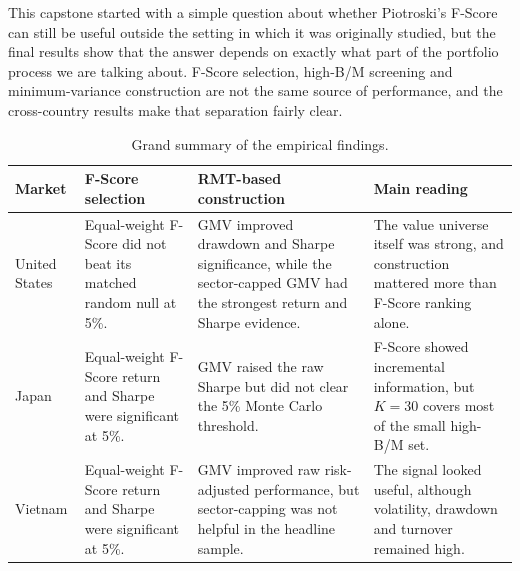 \documentclass[11pt,a4paper]{report}
\numberwithin{figure}{chapter}
\numberwithin{table}{chapter}
\numberwithin{equation}{chapter}
\begin{document}
This capstone started with a simple question about whether Piotroski's F-Score can still be useful outside the setting in which it was originally studied, but the final results show that the answer depends on exactly what part of the portfolio process we are talking about. F-Score selection, high-B/M screening and minimum-variance construction are not the same source of performance, and the cross-country results make that separation fairly clear.

\begin{table}[H]
\centering
\scriptsize
\caption{Grand summary of the empirical findings.}
\label{tab:grand_summary}

\setlength{\tabcolsep}{2.5pt}

\begin{tabular}{
@{}
>{\raggedright\arraybackslash}m{}
>{\raggedright\arraybackslash}m{}
>{\raggedright\arraybackslash}m{}
>{\raggedright\arraybackslash}m{}
@{}
}
\hline

\textbf{Market} &
\textbf{F-Score selection} &
\textbf{RMT-based construction} &
\textbf{Main reading} \\
\hline

United States &
Equal-weight F-Score did not beat its matched random null at 5\%. &
GMV improved drawdown and Sharpe significance, while the sector-capped GMV had the strongest return and Sharpe evidence. &
The value universe itself was strong, and construction mattered more than F-Score ranking alone. \\
\arrayrulecolor{gray!30}\hline\arrayrulecolor{black}

Japan &
Equal-weight F-Score return and Sharpe were significant at 5\%. &
GMV raised the raw Sharpe but did not clear the 5\% Monte Carlo threshold. &
F-Score showed incremental information, but $K=30$ covers most of the small high-B/M set. \\
\arrayrulecolor{gray!30}\hline\arrayrulecolor{black}

Vietnam &
Equal-weight F-Score return and Sharpe were significant at 5\%. &
GMV improved raw risk-adjusted performance, but sector-capping was not helpful in the headline sample. &
The signal looked useful, although volatility, drawdown and turnover remained high. \\

\hline
\end{tabular}

\end{table}
\end{document}
